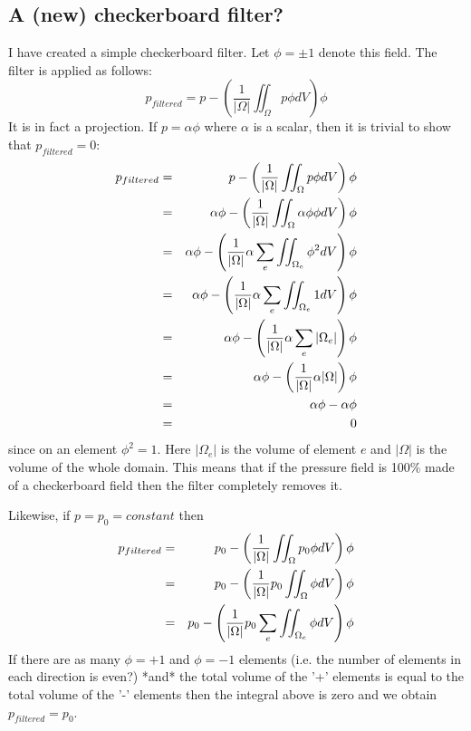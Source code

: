 \subsection*{A (new) checkerboard filter?}

I have created a simple checkerboard filter. Let $\phi=\pm 1$ denote this field.
The filter is applied as follows:
\[
p_{filtered} = p - \left( \frac{1}{|\Omega|} \iint_\Omega p \phi dV \right) \phi
\]
It is in fact a projection. If $p=\alpha \phi$  where $\alpha$ is a scalar, then 
it is trivial to show that $p_{filtered} =0$:
\begin{eqnarray}
p_{filtered} 
&=& p - \left( \frac{1}{|\Omega|} \iint_\Omega p \phi dV \right) \phi \nonumber\\
&=& \alpha \phi - \left( \frac{1}{|\Omega|} \iint_\Omega \alpha \phi \phi dV \right) \phi \nonumber\\
&=& \alpha \phi - \left( \frac{1}{|\Omega|} \alpha \sum_e \iint_{\Omega_e} \phi^2 dV \right) \phi \nonumber\\
&=& \alpha \phi - \left( \frac{1}{|\Omega|} \alpha \sum_e \iint_{\Omega_e} 1 dV \right) \phi \nonumber\\
&=& \alpha \phi - \left( \frac{1}{|\Omega|} \alpha \sum_e |{\Omega_e}| \right) \phi \nonumber\\
&=& \alpha \phi - \left( \frac{1}{|\Omega|} \alpha |\Omega| \right) \phi \nonumber\\
&=& \alpha \phi - \alpha\phi \nonumber\\
&=& 0 
\end{eqnarray}
since on an element $\phi^2=1$. Here $|\Omega_e|$ is the volume of element $e$ and $|\Omega|$ is the 
volume of the whole domain.
This means that if the pressure field is 100\% made of a checkerboard field then the 
filter completely removes it.

Likewise, if $p=p_0=constant$ then 
\begin{eqnarray}
p_{filtered} 
&=& p_0 - \left( \frac{1}{|\Omega|} \iint_\Omega p_0 \phi dV \right) \phi \nonumber\\
&=& p_0 - \left( \frac{1}{|\Omega|} p_0 \iint_\Omega  \phi dV \right) \phi \nonumber\\ 
&=& p_0 - \left( \frac{1}{|\Omega|} p_0 \sum_e \iint_{\Omega_e}  \phi dV \right) \phi \nonumber
\end{eqnarray}
If there are as many $\phi=+1$ and $\phi=-1$ elements (i.e. the number of elements in 
each direction is even?) *and* the total volume of the '+' elements is equal 
to the total volume of the '-' elements then the integral above is zero and 
we obtain $p_{filtered}=p_0$.

